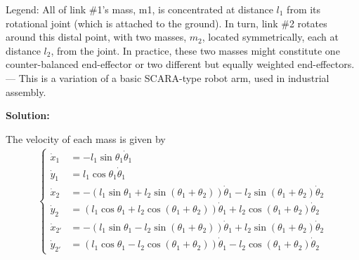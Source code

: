 \documentclass[conference,onecolumn]{IEEEtran}
\begin{document}
\begin{enumerate}
\begin{enumerate}
                        Legend: All of link \#1's mass, m1, is concentrated at distance $l_1$ from its rotational joint
                        (which is attached to the ground).
                        In turn, link \#2 rotates around this distal point, with two masses, $m_2$, located symmetrically, each at distance $l_2$, from the joint.
                        In practice, these two masses might constitute one counter-balanced end-effector or two different but equally weighted end-effectors.
                        — This is a variation of a basic SCARA-type robot arm, used in industrial assembly.

                        \textbf{Solution:}

                        The velocity of each mass is given by
                        \begin{align*}
                              \begin{cases}
                                    \dot{x}_1    & = - l_1 \sin \theta_1 \dot{\theta}_1                                                                                    \\
                                    \dot{y}_1    & = l_1 \cos \theta_1 \dot{\theta}_1                                                                                      \\
                                    \dot{x}_2    & = - (l_1 \sin \theta_1 + l_2 \sin(\theta_1 + \theta_2)) \dot{\theta}_1 - l_2 \sin (\theta_1 + \theta_2) \dot{\theta}_2  \\
                                    \dot{y}_2    & = (l_1 \cos \theta_1 + l_2 \cos(\theta_1 + \theta_2)) \dot{\theta}_1 + l_2 \cos (\theta_1 + \theta_2) \dot{\theta}_2    \\
                                    \dot{x}_{2'} & = - (l_1 \sin \theta_1 - l_2 \sin (\theta_1 + \theta_2)) \dot{\theta}_1 + l_2 \sin (\theta_1 + \theta_2) \dot{\theta}_2 \\
                                    \dot{y}_{2'} & = (l_1 \cos \theta_1 - l_2 \cos (\theta_1 + \theta_2)) \dot{\theta}_1 - l_2 \cos (\theta_1 + \theta_2) \dot{\theta}_2
                              \end{cases}
                        \end{align*}


\end{enumerate}
\end{enumerate}
\end{document}
